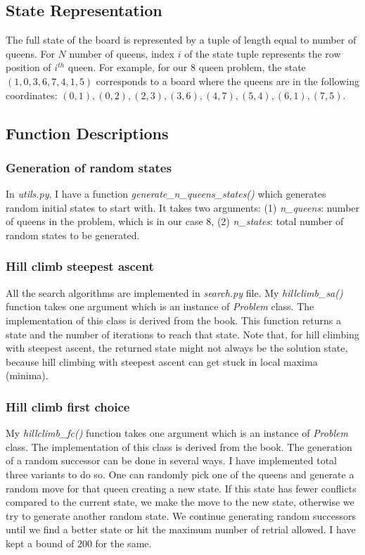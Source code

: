 \subsection*{State Representation}
The full state of the board is represented by a tuple of length equal to number of queens. For $N$ number of queens, index $i$ of the state tuple represents the row position of $i^{th}$ queen. For example, for our $8$ queen problem, the state $(1,0,3,6,7,4,1,5)$ corresponds to a board where the queens are in the following coordinates: $(0,1),(0,2),(2,3),(3,6),(4,7),(5,4),(6,1),(7,5)$.
\subsection*{Function Descriptions}
\subsubsection*{Generation of random states}
In \textit{utils.py}, I have a function \textit{generate\_n\_queens\_states()} which generates random initial states to start with. It takes two arguments: (1) \textit{n\_queens}: number of queens in the problem, which is in our case $8$, (2) \textit{n\_states}: total number of random states to be generated. 
\subsubsection*{Hill climb steepest ascent}
All the search algorithms are implemented in \textit{search.py} file. My \textit{hillclimb\_sa()} function takes one argument which is an instance of \textit{Problem} class. The implementation of this class is derived from the book. This function returns a state and the number of iterations to reach that state. Note that, for hill climbing with steepest ascent, the returned state might not always be the solution state, because hill climbing with steepest ascent can get stuck in local maxima (minima).
\subsubsection*{Hill climb first choice}
My \textit{hillclimb\_fc()} function takes one argument which is an instance of \textit{Problem} class. The implementation of this class is derived from the book. The generation of a random successor can be done in several ways. I have implemented total three variants to do so. One can randomly pick one of the queens and generate a random move for that queen creating a new state. If this state has fewer conflicts compared to the current state, we make the move to the new state, otherwise we try to generate another random state. We continue generating random successors until we find a better state or hit the maximum number of retrial allowed. I have kept a bound of $200$ for the same.

